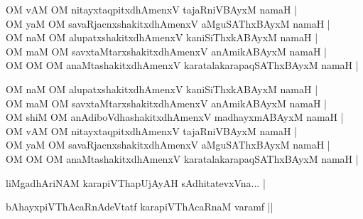 \begin{entry}
\begin{shl}
OM vAM OM nitayxtaqpitxdhAmenxV tajaRniVBAyxM namaH |\\[2pt]
OM yaM OM savaRjacnxshakitxdhAmenxV aMguSAThxBAyxM namaH |\\[2pt]
OM naM OM alupatxshakitxdhAmenxV kaniSiThxkABAyxM namaH |\\[2pt]
OM maM OM savxtaMtarxshakitxdhAmenxV anAmikABAyxM namaH |\\[2pt]
OM OM OM anaMtashakitxdhAmenxV karatalakarapaqSAThxBAyxM namaH |
\end{shl}
\smallskip
{}
\smallskip
\begin{shl}
OM naM OM alupatxshakitxdhAmenxV kaniSiThxkABAyxM namaH |\\[2pt]
OM maM OM savxtaMtarxshakitxdhAmenxV anAmikABAyxM namaH |\\[2pt]
OM shiM OM anAdiboVdhashakitxdhAmenxV madhayxmABAyxM namaH |\\[2pt]
OM vAM OM nitayxtaqpitxdhAmenxV tajaRniVBAyxM namaH |\\[2pt]
OM yaM OM savaRjacnxshakitxdhAmenxV aMguSAThxBAyxM namaH |\\[2pt]
OM OM OM anaMtashakitxdhAmenxV karatalakarapaqSAThxBAyxM namaH |
\end{shl}
\smallskip
{}
\end{entry}

\begin{entry}
\smallskip
\begin{shl}
liMgadhAriNAM karapiVThapUjAyAH sAdhitatevxVna... |
\end{shl}
\medskip
{}
\end{entry}

\begin{entry}
\smallskip
\begin{shl}
bAhayxpiVThAcaRnAdeVtatf karapiVThAcaRnaM varamf ||
\end{shl}
\medskip
{}
\end{entry}

